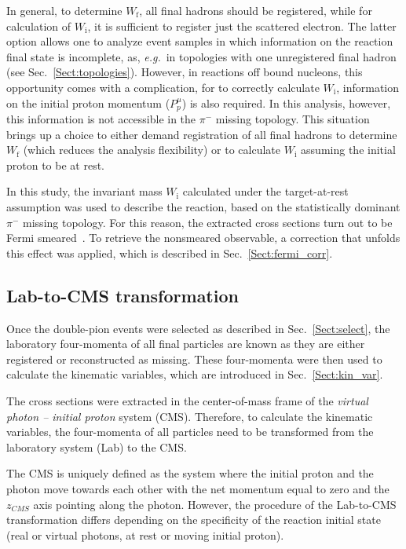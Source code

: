 \documentclass[prc,twocolumn,superscriptaddress,showpacs,amssymb,amsmath,amsfonts,aps,nofootinbib]{revtex4-1}
\begin{document}
In general, to determine $W_{\text{f}}$, all final hadrons should be registered, while for calculation of $W_{\text{i}}$, it is sufficient to register just the scattered electron. The latter option allows one to analyze event samples in which information on the reaction final state is incomplete, as, {\it e.g.}~in topologies with one unregistered final hadron (see Sec.\!~\ref{Sect:topologies}). However, in reactions off bound nucleons, this opportunity comes with a complication, for to correctly calculate $W_{\text{i}}$, information on the initial proton momentum ($P_{p}^{\mu}$) is also required. In this analysis, however, this information is not accessible in the $\pi^{-}$ missing topology. This situation brings up a choice to either demand registration of all final hadrons to determine $W_{\text{f}}$ (which reduces the analysis flexibility) or to calculate $W_{\text{i}}$ assuming the initial proton to be at rest.  


In this study, the invariant mass $W_{\text{i}}$ calculated under the target-at-rest assumption was used to describe the reaction, based on the statistically dominant $\pi^{-}$ missing topology. For this reason, the extracted cross sections turn out to be Fermi smeared~\cite{Skorodumina:2015rea,twopeg-d}. To retrieve the nonsmeared observable, a correction that unfolds this effect was applied, which is described in Sec.\!~\ref{Sect:fermi_corr}.



\subsection{Lab-to-CMS transformation}
\label{Sect:lab_cms}

Once the double-pion events were selected as described in Sec.~\ref{Sect:select}, the laboratory four-momenta of all final particles are known as they are either registered or reconstructed as missing. These four-momenta were then used to calculate the kinematic variables, which are introduced in Sec.\!~\ref{Sect:kin_var}. 

The cross sections were extracted in the center-of-mass frame of the {\em virtual photon -- initial proton} system (CMS). Therefore, to calculate the kinematic variables, the four-momenta of all particles need to be transformed from the laboratory system (Lab) to the CMS.

The CMS is uniquely defined as the system where the initial proton and the photon move towards each other with the net momentum equal to zero and the $z_{CMS}$ axis pointing along the photon. However, the procedure of the Lab-to-CMS transformation differs depending on the specificity of the reaction initial state (real or virtual photons, at rest or moving initial proton).
 
\end{document}
